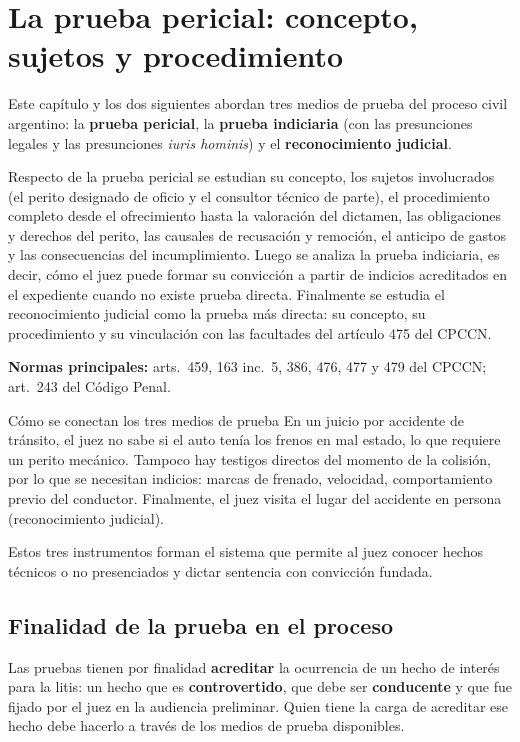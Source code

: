 \documentclass[12pt,oneside]{book}
\begin{document}
\chapter[La prueba pericial]{La prueba pericial: concepto, sujetos y procedimiento}\label{cap:pericial}

Este capítulo y los dos siguientes abordan tres medios de prueba del proceso civil argentino: la \textbf{prueba pericial}, la \textbf{prueba indiciaria} (con las presunciones legales y las presunciones \textit{iuris hominis}) y el \textbf{reconocimiento judicial}.

Respecto de la prueba pericial se estudian su concepto, los sujetos involucrados (el perito designado de oficio y el consultor técnico de parte), el procedimiento completo desde el ofrecimiento hasta la valoración del dictamen, las obligaciones y derechos del perito, las causales de recusación y remoción, el anticipo de gastos y las consecuencias del incumplimiento. Luego se analiza la prueba indiciaria, es decir, cómo el juez puede formar su convicción a partir de indicios acreditados en el expediente cuando no existe prueba directa. Finalmente se estudia el reconocimiento judicial como la prueba más directa: su concepto, su procedimiento y su vinculación con las facultades del artículo 475 del CPCCN.

\textbf{Normas principales:} arts.\ 459, 163 inc.\ 5, 386, 476, 477 y 479 del CPCCN; art.\ 243 del Código Penal.

\begin{example}{Cómo se conectan los tres medios de prueba}
En un juicio por accidente de tránsito, el juez no sabe si el auto tenía los frenos en mal estado, lo que requiere un perito mecánico. Tampoco hay testigos directos del momento de la colisión, por lo que se necesitan indicios: marcas de frenado, velocidad, comportamiento previo del conductor. Finalmente, el juez visita el lugar del accidente en persona (reconocimiento judicial).

Estos tres instrumentos forman el sistema que permite al juez conocer hechos técnicos o no presenciados y dictar sentencia con convicción fundada.
\end{example}

\section{Finalidad de la prueba en el proceso}

Las pruebas tienen por finalidad \textbf{acreditar} la ocurrencia de un hecho de interés para la litis: un hecho que es \textbf{controvertido}, que debe ser \textbf{conducente} y que fue fijado por el juez en la audiencia preliminar. Quien tiene la carga de acreditar ese hecho debe hacerlo a través de los medios de prueba disponibles.
\end{document}

